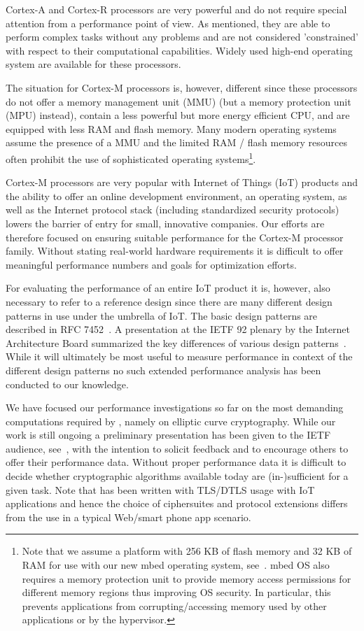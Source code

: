 \documentclass[peerreview, a4paper, draft, 7pt]{IEEEtran}
\begin{document}
Cortex-A and Cortex-R processors are very powerful and do not require special attention from a performance point of view. As mentioned, they are able to perform complex tasks without any problems and are not considered 'constrained' with respect to their computational capabilities. Widely used high-end operating system are available for these processors. 

The situation for Cortex-M processors is, however, different since these processors do not offer a memory management unit (MMU) (but a memory protection unit (MPU) instead), contain a less powerful but more energy efficient CPU, and are equipped with less RAM and flash memory. Many modern operating systems assume the presence of a MMU and the limited RAM / flash memory resources often prohibit the use of sophisticated operating systems\footnote{Note that we assume a platform with 256 KB of flash memory and 32 KB of RAM for use with our new mbed operating system, see~\cite{mbed}. mbed OS also requires a memory protection unit to provide memory access permissions for different memory regions thus improving OS security. In particular, this prevents applications from corrupting/accessing memory used by other applications or by the hypervisor.}.

Cortex-M processors are very popular with Internet of Things (IoT) products and the ability to offer an online development environment, an operating system, as well as the Internet protocol stack (including standardized security protocols) lowers the barrier of entry for small, innovative companies. Our efforts are therefore focused on ensuring suitable performance for the Cortex-M processor family. Without stating real-world hardware requirements it is difficult to offer meaningful performance numbers and goals for optimization efforts.

For evaluating the performance of an entire IoT product it is, however, also necessary to refer to a reference design since there are many different design patterns in use under the umbrella of IoT. The basic design patterns are described in RFC 7452~\cite{rfc7452}. A presentation at the IETF 92 plenary by the Internet Architecture Board summarized the key differences of various design patterns~\cite{IETF92}. While it will ultimately be most useful to measure performance in context of the different design patterns no such extended performance analysis has been conducted to our knowledge. 

We have focused our performance investigations so far on the most demanding computations required by \cite{draft-ietf-dice-profile}, namely on elliptic curve cryptography. While our work is still ongoing a preliminary presentation has been given to the IETF audience, see~\cite{LWIG}, with the intention to solicit feedback and to encourage others to offer their performance data. Without proper performance data it is difficult to decide whether cryptographic algorithms available today are (in-)sufficient for a given task. Note that \cite{draft-ietf-dice-profile} has been written with TLS/DTLS usage with IoT applications and hence the choice of ciphersuites and protocol extensions differs from the use in a typical Web/smart phone app scenario. 
\end{document}
